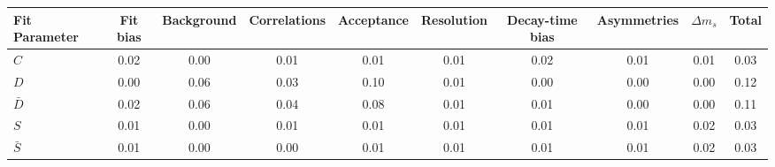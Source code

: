 \begin{tabular}{l  c  c  c  c  c  c  c  c  | c }
\hline
\hline
Fit Parameter & Fit bias & Background & Correlations & Acceptance & Resolution & Decay-time bias & Asymmetries & $\Delta m_{s}$ &  Total  \\ 
\hline
$C$ & 0.02 & 0.00 & 0.01 & 0.01 & 0.01 & 0.02 & 0.01 & 0.01 & 0.03 \\ 
$D$ & 0.00 & 0.06 & 0.03 & 0.10 & 0.01 & 0.00 & 0.00 & 0.00 & 0.12 \\ 
$\bar{D}$ & 0.02 & 0.06 & 0.04 & 0.08 & 0.01 & 0.01 & 0.00 & 0.00 & 0.11 \\ 
$S$ & 0.01 & 0.00 & 0.01 & 0.01 & 0.01 & 0.01 & 0.01 & 0.02 & 0.03 \\ 
$\bar{S}$ & 0.01 & 0.00 & 0.00 & 0.01 & 0.01 & 0.01 & 0.01 & 0.02 & 0.03 \\ 
\hline
\hline
\end{tabular}
